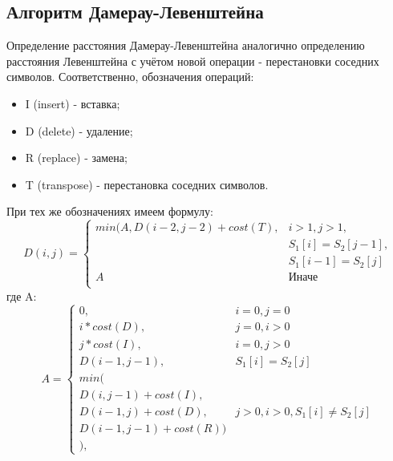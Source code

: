 \subsection{Алгоритм Дамерау-Левенштейна}
Определение расстояния Дамерау-Левенштейна аналогично определению расстояния Левенштейна с учётом новой операции - перестановки соседних символов. Соответственно, обозначения операций:
\begin{itemize}
    \item I (insert) - вставка;
    \item D (delete) - удаление;
    \item R (replace) - замена;
    \item T (transpose) - перестановка соседних символов.
\end{itemize}

При тех же обозначениях имеем формулу:
\begin{displaymath}
D(i,j) = \left\{ \begin{array}{ll}
 min(A, D(i - 2, j - 2) + cost(T), & \textrm{$i > 1, j > 1,$}\\
 & \textrm{$S_1[i] = S_2[j - 1],$}\\
 & \textrm{$S_1[i - 1] = S_2[j]$}\\
 A & \textrm{Иначе}\\
  \end{array} \right.
\end{displaymath}
где A:
\begin{displaymath}
A = \left\{ \begin{array}{ll}
 0, & \textrm{$i = 0, j = 0$}\\
 i * cost(D), & \textrm{$j = 0, i > 0$}\\
 j * cost(I), & \textrm{$i = 0, j > 0$}\\
 D(i - 1, j - 1), & \textrm{$S_{1}[i] = S_{2}[j]$}\\
min(\\
D(i,j-1) + cost(I),\\
D(i-1, j) + cost(D), &\textrm{$j > 0, i > 0, S_1[i] \neq S_2[j]$}\\
D(i-1, j-1) + cost(R))\\
),
  \end{array} \right.
\end{displaymath}


